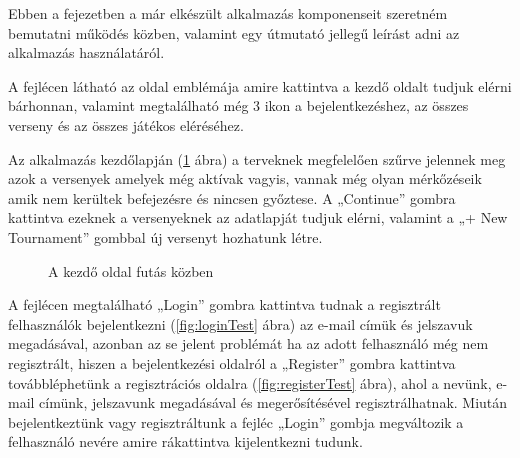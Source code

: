 
Ebben a fejezetben a már elkészült alkalmazás komponenseit szeretném bemutatni működés közben, valamint egy útmutató jellegű leírást adni az alkalmazás használatáról.

A fejlécen látható az oldal emblémája amire kattintva a kezdő oldalt tudjuk elérni bárhonnan, valamint megtalálható még 3 ikon a bejelentkezéshez, az összes verseny és az összes játékos eléréséhez.

Az alkalmazás kezdőlapján (\ref{fig:homeTest} ábra) a terveknek megfelelően szűrve jelennek meg azok a versenyek amelyek még aktívak vagyis, vannak még olyan mérkőzéseik amik nem kerültek befejezésre és nincsen győztese. A „Continue” gombra kattintva ezeknek a versenyeknek az adatlapját tudjuk elérni, valamint a „+ New Tournament” gombbal új versenyt hozhatunk létre.

\begin{figure}[h]
\centering
{}
\caption{A kezdő oldal futás közben}
\label{fig:homeTest}
\end{figure}

A fejlécen megtalálható „Login” gombra kattintva tudnak a regisztrált felhasználók bejelentkezni (\ref{fig:loginTest} ábra) az e-mail címük és jelszavuk megadásával, azonban az se jelent problémát ha az adott felhasználó még nem regisztrált, hiszen a bejelentkezési oldalról a „Register” gombra kattintva továbbléphetünk a regisztrációs oldalra (\ref{fig:registerTest} ábra), ahol a nevünk, e-mail címünk, jelszavunk megadásával és megerősítésével regisztrálhatnak. Miután bejelentkeztünk vagy regisztráltunk a fejléc „Login” gombja megváltozik a felhasználó nevére amire rákattintva kijelentkezni tudunk.

